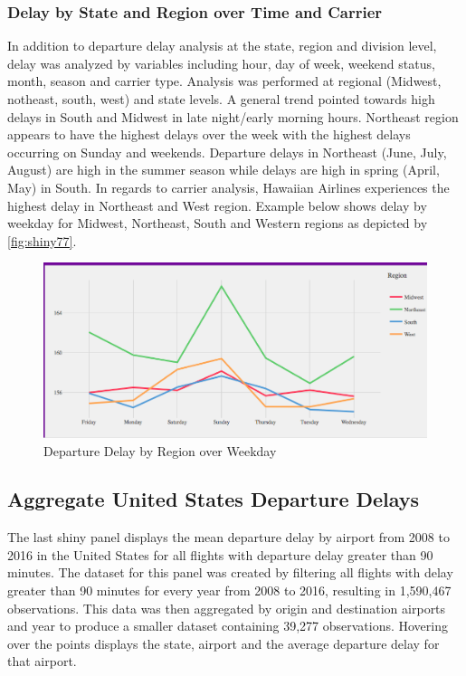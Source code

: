 \documentclass[12pt,twoside]{amherstthesis}
\begin{document}
  \subsubsection{Delay by State and Region over Time and
  Carrier}\label{delay-by-state-and-region-over-time-and-carrier}
  
  In addition to departure delay analysis at the state, region and
  division level, delay was analyzed by variables including hour, day of
  week, weekend status, month, season and carrier type. Analysis was
  performed at regional (Midwest, notheast, south, west) and state levels.
  A general trend pointed towards high delays in South and Midwest in late
  night/early morning hours. Northeast region appears to have the highest
  delays over the week with the highest delays occurring on Sunday and
  weekends. Departure delays in Northeast (June, July, August) are high in
  the summer season while delays are high in spring (April, May) in South.
  In regards to carrier analysis, Hawaiian Airlines experiences the
  highest delay in Northeast and West region. Example below shows delay by
  weekday for Midwest, Northeast, South and Western regions as depicted by
  \autoref{fig:shiny77}.
  
  \begin{figure}[htbp]
  \centering
  \includegraphics[scale = 0.4,angle = 0]{figure/DelayWeekday.png}
  \caption[Departure Delay by Region over Weekday]{\normalsize{Departure Delay by Region over Weekday}}
  \label{fig:shiny77}
  \end{figure}
  
  \clearpage
  
  \subsection{Aggregate United States Departure
  Delays}\label{aggregate-united-states-departure-delays}
  
  The last shiny panel displays the mean departure delay by airport from
  2008 to 2016 in the United States for all flights with departure delay
  greater than 90 minutes. The dataset for this panel was created by
  filtering all flights with delay greater than 90 minutes for every year
  from 2008 to 2016, resulting in 1,590,467 observations. This data was
  then aggregated by origin and destination airports and year to produce a
  smaller dataset containing 39,277 observations. Hovering over the points
  displays the state, airport and the average departure delay for that
  airport.
  
\end{document}
